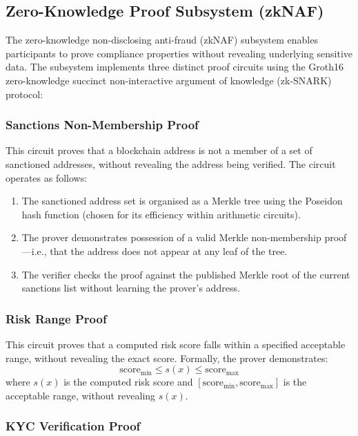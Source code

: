 \documentclass[12pt,a4paper]{article}
\begin{document}
\subsection{Zero-Knowledge Proof Subsystem (zkNAF)}

The zero-knowledge non-disclosing anti-fraud (zkNAF) subsystem enables 
participants to prove compliance properties without revealing underlying 
sensitive data. The subsystem implements three distinct proof circuits using 
the Groth16 zero-knowledge succinct non-interactive argument of knowledge 
(zk-SNARK) protocol:

\subsubsection{Sanctions Non-Membership Proof}

This circuit proves that a blockchain address is not a member of a set of 
sanctioned addresses, without revealing the address being verified. The 
circuit operates as follows:
\begin{enumerate}
\item The sanctioned address set is organised as a Merkle tree using the 
Poseidon hash function (chosen for its efficiency within arithmetic circuits).
\item The prover demonstrates possession of a valid Merkle non-membership 
proof---i.e., that the address does not appear at any leaf of the tree.
\item The verifier checks the proof against the published Merkle root of the 
current sanctions list without learning the prover's address.
\end{enumerate}

\subsubsection{Risk Range Proof}

This circuit proves that a computed risk score falls within a specified 
acceptable range, without revealing the exact score. Formally, the prover 
demonstrates:
\begin{equation}
\text{score}_{\min} \leq s(x) \leq \text{score}_{\max}
\end{equation}
where $s(x)$ is the computed risk score and $[\text{score}_{\min}, 
\text{score}_{\max}]$ is the acceptable range, without revealing $s(x)$.

\subsubsection{KYC Verification Proof}
\end{document}

